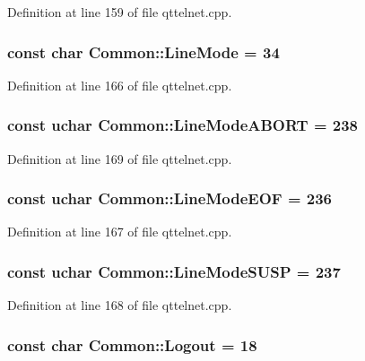 Definition at line 159 of file qttelnet.cpp.

\hypertarget{namespaceCommon_a214d2308bb455b60a95ff913615c7e9e}{
\subsubsection[{LineMode}]{\setlength{\rightskip}{0pt plus 5cm}const char {\bf Common::LineMode} = 34}}
\label{namespaceCommon_a214d2308bb455b60a95ff913615c7e9e}


Definition at line 166 of file qttelnet.cpp.

\hypertarget{namespaceCommon_ab373560f6dea410b14e62eec85969723}{
\subsubsection[{LineModeABORT}]{\setlength{\rightskip}{0pt plus 5cm}const uchar {\bf Common::LineModeABORT} = 238}}
\label{namespaceCommon_ab373560f6dea410b14e62eec85969723}


Definition at line 169 of file qttelnet.cpp.

\hypertarget{namespaceCommon_a6edd4cd3ec1b63415bf6f9f5db9dce8f}{
\subsubsection[{LineModeEOF}]{\setlength{\rightskip}{0pt plus 5cm}const uchar {\bf Common::LineModeEOF} = 236}}
\label{namespaceCommon_a6edd4cd3ec1b63415bf6f9f5db9dce8f}


Definition at line 167 of file qttelnet.cpp.

\hypertarget{namespaceCommon_a2fe681450f43d8682ce640d992517710}{
\subsubsection[{LineModeSUSP}]{\setlength{\rightskip}{0pt plus 5cm}const uchar {\bf Common::LineModeSUSP} = 237}}
\label{namespaceCommon_a2fe681450f43d8682ce640d992517710}


Definition at line 168 of file qttelnet.cpp.

\hypertarget{namespaceCommon_a506856853df9fbd448dc5c5c049c8313}{
\subsubsection[{Logout}]{\setlength{\rightskip}{0pt plus 5cm}const char {\bf Common::Logout} = 18}}
\label{namespaceCommon_a506856853df9fbd448dc5c5c049c8313}


